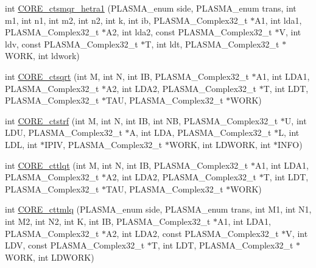 \begin{DoxyCompactItemize}
int \hyperlink{group__CORE__PLASMA__Complex32__t_gaf062e7ba21ee418d0d9779dbf01c6390_gaf062e7ba21ee418d0d9779dbf01c6390}{C\+O\+R\+E\+\_\+ctsmqr\+\_\+hetra1} (P\+L\+A\+S\+M\+A\+\_\+enum side, P\+L\+A\+S\+M\+A\+\_\+enum trans, int m1, int n1, int m2, int n2, int k, int ib, P\+L\+A\+S\+M\+A\+\_\+\+Complex32\+\_\+t $\ast$A1, int lda1, P\+L\+A\+S\+M\+A\+\_\+\+Complex32\+\_\+t $\ast$A2, int lda2, const P\+L\+A\+S\+M\+A\+\_\+\+Complex32\+\_\+t $\ast$V, int ldv, const P\+L\+A\+S\+M\+A\+\_\+\+Complex32\+\_\+t $\ast$T, int ldt, P\+L\+A\+S\+M\+A\+\_\+\+Complex32\+\_\+t $\ast$W\+O\+R\+K, int ldwork)
\item 
int \hyperlink{group__CORE__PLASMA__Complex32__t_gaa0f009ac37aee2a788692cc46225a64a_gaa0f009ac37aee2a788692cc46225a64a}{C\+O\+R\+E\+\_\+ctsqrt} (int M, int N, int I\+B, P\+L\+A\+S\+M\+A\+\_\+\+Complex32\+\_\+t $\ast$A1, int L\+D\+A1, P\+L\+A\+S\+M\+A\+\_\+\+Complex32\+\_\+t $\ast$A2, int L\+D\+A2, P\+L\+A\+S\+M\+A\+\_\+\+Complex32\+\_\+t $\ast$T, int L\+D\+T, P\+L\+A\+S\+M\+A\+\_\+\+Complex32\+\_\+t $\ast$T\+A\+U, P\+L\+A\+S\+M\+A\+\_\+\+Complex32\+\_\+t $\ast$W\+O\+R\+K)
\item 
int \hyperlink{group__CORE__PLASMA__Complex32__t_gaec00749a149362afedaa0bab2d69fdfc_gaec00749a149362afedaa0bab2d69fdfc}{C\+O\+R\+E\+\_\+ctstrf} (int M, int N, int I\+B, int N\+B, P\+L\+A\+S\+M\+A\+\_\+\+Complex32\+\_\+t $\ast$U, int L\+D\+U, P\+L\+A\+S\+M\+A\+\_\+\+Complex32\+\_\+t $\ast$A, int L\+D\+A, P\+L\+A\+S\+M\+A\+\_\+\+Complex32\+\_\+t $\ast$L, int L\+D\+L, int $\ast$I\+P\+I\+V, P\+L\+A\+S\+M\+A\+\_\+\+Complex32\+\_\+t $\ast$W\+O\+R\+K, int L\+D\+W\+O\+R\+K, int $\ast$I\+N\+F\+O)
\item 
int \hyperlink{group__CORE__PLASMA__Complex32__t_ga3732acb715983d998575f8b077b0b979_ga3732acb715983d998575f8b077b0b979}{C\+O\+R\+E\+\_\+cttlqt} (int M, int N, int I\+B, P\+L\+A\+S\+M\+A\+\_\+\+Complex32\+\_\+t $\ast$A1, int L\+D\+A1, P\+L\+A\+S\+M\+A\+\_\+\+Complex32\+\_\+t $\ast$A2, int L\+D\+A2, P\+L\+A\+S\+M\+A\+\_\+\+Complex32\+\_\+t $\ast$T, int L\+D\+T, P\+L\+A\+S\+M\+A\+\_\+\+Complex32\+\_\+t $\ast$T\+A\+U, P\+L\+A\+S\+M\+A\+\_\+\+Complex32\+\_\+t $\ast$W\+O\+R\+K)
\item 
int \hyperlink{group__CORE__PLASMA__Complex32__t_ga1a3b2d9dd959660e4d649a35c8b51c5e_ga1a3b2d9dd959660e4d649a35c8b51c5e}{C\+O\+R\+E\+\_\+cttmlq} (P\+L\+A\+S\+M\+A\+\_\+enum side, P\+L\+A\+S\+M\+A\+\_\+enum trans, int M1, int N1, int M2, int N2, int K, int I\+B, P\+L\+A\+S\+M\+A\+\_\+\+Complex32\+\_\+t $\ast$A1, int L\+D\+A1, P\+L\+A\+S\+M\+A\+\_\+\+Complex32\+\_\+t $\ast$A2, int L\+D\+A2, const P\+L\+A\+S\+M\+A\+\_\+\+Complex32\+\_\+t $\ast$V, int L\+D\+V, const P\+L\+A\+S\+M\+A\+\_\+\+Complex32\+\_\+t $\ast$T, int L\+D\+T, P\+L\+A\+S\+M\+A\+\_\+\+Complex32\+\_\+t $\ast$W\+O\+R\+K, int L\+D\+W\+O\+R\+K)

\end{DoxyCompactItemize}
